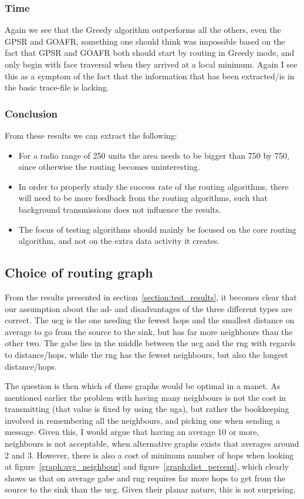 \subsubsection{Time}
Again we see that the Greedy algorithm outperforms all the others, even the GPSR and GOAFR, something one should think was impossible based on the fact that GPSR and GOAFR both should start by routing in Greedy mode, and only begin with face traversal when they arrived at a local minimum. Again I see this as a symptom of the fact that the information that has been extracted/is in the basic trace-file is lacking. 

\subsubsection{Conclusion}
From these results we can extract the following:
\begin{itemize}
\item For a radio range of 250 units the area needs to be bigger than 750 by 750, since otherwise the routing becomes uninteresting.
\item In order to properly study the success rate of the routing algorithms, there will need to be more feedback from the routing algorithms, such that background transmissions does not influence the results.
\item The focus of testing algorithms should mainly be focused on the core routing algorithm, and not on the extra data activity it creates. 
\end{itemize}

\subsection{Choice of routing graph}

From the results presented in section~\ref{section:test_results}, it becomes clear that our assumption about the ad- and disadvantages of the three different types are correct. The \ac{ucg} is the one needing the fewest hops and the smallest distance on average to go from the source to the sink, but has far more neighbours than the other two. The \ac{gabe} lies in the middle between the \ac{ucg} and the \ac{rng} with regards to distance/hops, while the \ac{rng} has the fewest neighbours, but also the longest distance/hops. 

The question is then which of these graphs would be optimal in a \ac{manet}. As mentioned earlier the problem with having many neighbours is not the cost in transmitting (that value is fixed by using the \ac{uga}), but rather the bookkeeping involved in remembering all the neighbours, and picking one when sending a message. Given this, I would argue that having an average 10 or more, neighbours is not acceptable, when alternative graphs exists that averages around 2 and 3. However, there is also a cost of minimum number of hops when looking at figure~\ref{graph:avg_neighbour} and figure~\ref{graph:dist_percent}, which clearly shows us that on average \ac{gabe} and \ac{rng} requires far more hops to get from the source to the sink than the \ac{ucg}. Given their planar nature, this is not surprising. 

